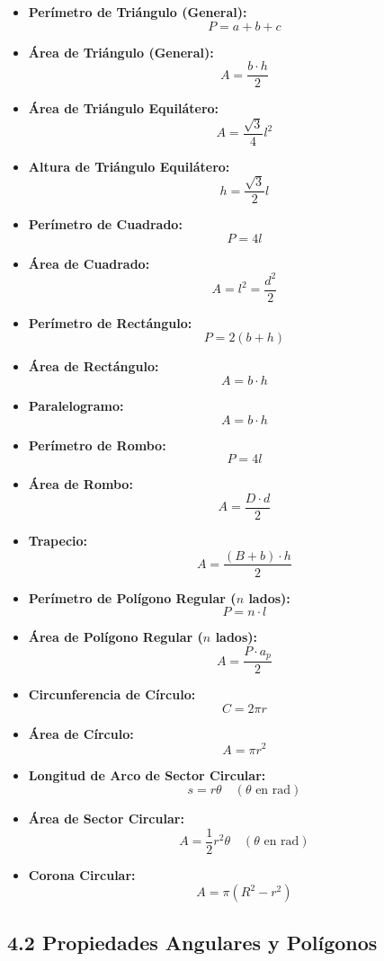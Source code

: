 \documentclass[11pt,a4paper]{article}
\begin{document}
\begin{itemize}
  \item \textbf{Perímetro de Triángulo (General):}
  \[
    P = a + b + c
  \]
  \item \textbf{Área de Triángulo (General):}
  \[
    A = \frac{b \cdot h}{2}
  \]
  \item \textbf{Área de Triángulo Equilátero:}
  \[
    A = \frac{\sqrt{3}}{4} l^2
  \]
  \item \textbf{Altura de Triángulo Equilátero:}
  \[
    h = \frac{\sqrt{3}}{2} l
  \]
  \item \textbf{Perímetro de Cuadrado:}
  \[
    P = 4l
  \]
  \item \textbf{Área de Cuadrado:}
  \[
    A = l^2 = \frac{d^2}{2}
  \]
  \item \textbf{Perímetro de Rectángulo:}
  \[
    P = 2(b + h)
  \]
  \item \textbf{Área de Rectángulo:}
  \[
    A = b \cdot h
  \]
  \item \textbf{Paralelogramo:}
  \[
    A = b \cdot h
  \]
  \item \textbf{Perímetro de Rombo:}
  \[
    P = 4l
  \]
  \item \textbf{Área de Rombo:}
  \[
    A = \frac{D \cdot d}{2}
  \]
  \item \textbf{Trapecio:}
  \[
    A = \frac{(B + b) \cdot h}{2}
  \]
  \item \textbf{Perímetro de Polígono Regular ($n$ lados):}
  \[
    P = n \cdot l
  \]
  \item \textbf{Área de Polígono Regular ($n$ lados):}
  \[
    A = \frac{P \cdot a_p}{2}
  \]
  \item \textbf{Circunferencia de Círculo:}
  \[
    C = 2\pi r
  \]
  \item \textbf{Área de Círculo:}
  \[
    A = \pi r^2
  \]
  \item \textbf{Longitud de Arco de Sector Circular:}
  \[
    s = r\theta \quad (\theta \text{ en rad})
  \]
  \item \textbf{Área de Sector Circular:}
  \[
    A = \frac{1}{2} r^2 \theta \quad (\theta \text{ en rad})
  \]
  \item \textbf{Corona Circular:}
  \[
    A = \pi(R^2 - r^2)
  \]
\end{itemize}

\subsection*{4.2 Propiedades Angulares y Polígonos}
\end{document}
